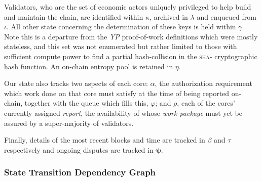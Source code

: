 Validators, who are the set of economic actors uniquely privileged to help build and maintain the \Jam chain, are identified within $\kappa$, archived in $\lambda$ and enqueued from $\iota$. All other state concerning the determination of these keys is held within $\gamma$. Note this is a departure from the \emph{YP} proof-of-work definitions which were mostly stateless, and this set was not enumerated but rather limited to those with sufficient compute power to find a partial hash-collision in the \textsc{sha}- cryptographic hash function. An on-chain entropy pool is retained in $\eta$.

Our state also tracks two aspects of each core: $\alpha$, the authorization requirement which work done on that core must satisfy at the time of being reported on-chain, together with the queue which fills this, $\varphi$; and $\rho$, each of the cores' currently assigned \emph{report}, the availability of whose \emph{work-package} must yet be assured by a super-majority of validators.

Finally, details of the most recent blocks and time are tracked in $\beta$ and $\tau$ respectively and ongoing disputes are tracked in $\bm{\psi}$.

\subsubsection{State Transition Dependency Graph}

